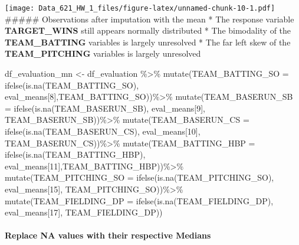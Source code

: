 \documentclass[
]{article}
\newenvironment{Shaded}{\begin{snugshade}}{\end{snugshade}}
\newcommand{\AttributeTok}[1]{\textcolor[rgb]{0.77,0.63,0.00}{#1}}
\newcommand{\DecValTok}[1]{\textcolor[rgb]{0.00,0.00,0.81}{#1}}
\newcommand{\FunctionTok}[1]{\textcolor[rgb]{0.00,0.00,0.00}{#1}}
\newcommand{\NormalTok}[1]{#1}
\newcommand{\OtherTok}[1]{\textcolor[rgb]{0.56,0.35,0.01}{#1}}
\newcommand{\SpecialCharTok}[1]{\textcolor[rgb]{0.00,0.00,0.00}{#1}}
\begin{document}
\texttt{[image: Data\_621\_HW\_1\_files/figure-latex/unnamed-chunk-10-1.pdf]}
\#\#\#\#\# Observations after imputation with the mean * The response
variable \textbf{TARGET\_WINS} still appears normally distributed * The
bimodality of the \textbf{TEAM\_BATTING} variables is largely unresolved
* The far left skew of the \textbf{TEAM\_PITCHING} variables is largely
unresolved

\begin{Shaded}
\begin{Highlighting}[]
\NormalTok{df\_evaluation\_mn }\OtherTok{\textless{}{-}}\NormalTok{ df\_evaluation }\SpecialCharTok{\%\textgreater{}\%}
  \FunctionTok{mutate}\NormalTok{(}\AttributeTok{TEAM\_BATTING\_SO =}
           \FunctionTok{ifelse}\NormalTok{(}\FunctionTok{is.na}\NormalTok{(TEAM\_BATTING\_SO),}
\NormalTok{                  eval\_means[}\DecValTok{8}\NormalTok{],TEAM\_BATTING\_SO))}\SpecialCharTok{\%\textgreater{}\%} 
  \FunctionTok{mutate}\NormalTok{(}\AttributeTok{TEAM\_BASERUN\_SB =} 
           \FunctionTok{ifelse}\NormalTok{(}\FunctionTok{is.na}\NormalTok{(TEAM\_BASERUN\_SB),}
\NormalTok{                  eval\_means[}\DecValTok{9}\NormalTok{], TEAM\_BASERUN\_SB))}\SpecialCharTok{\%\textgreater{}\%}
  \FunctionTok{mutate}\NormalTok{(}\AttributeTok{TEAM\_BASERUN\_CS =}
           \FunctionTok{ifelse}\NormalTok{(}\FunctionTok{is.na}\NormalTok{(TEAM\_BASERUN\_CS),}
\NormalTok{                  eval\_means[}\DecValTok{10}\NormalTok{], TEAM\_BASERUN\_CS))}\SpecialCharTok{\%\textgreater{}\%}
  \FunctionTok{mutate}\NormalTok{(}\AttributeTok{TEAM\_BATTING\_HBP =} 
           \FunctionTok{ifelse}\NormalTok{(}\FunctionTok{is.na}\NormalTok{(TEAM\_BATTING\_HBP),}
\NormalTok{                  eval\_means[}\DecValTok{11}\NormalTok{],TEAM\_BATTING\_HBP))}\SpecialCharTok{\%\textgreater{}\%}
  \FunctionTok{mutate}\NormalTok{(}\AttributeTok{TEAM\_PITCHING\_SO =}
           \FunctionTok{ifelse}\NormalTok{(}\FunctionTok{is.na}\NormalTok{(TEAM\_PITCHING\_SO),}
\NormalTok{                  eval\_means[}\DecValTok{15}\NormalTok{], TEAM\_PITCHING\_SO))}\SpecialCharTok{\%\textgreater{}\%}
  \FunctionTok{mutate}\NormalTok{(}\AttributeTok{TEAM\_FIELDING\_DP =}
           \FunctionTok{ifelse}\NormalTok{(}\FunctionTok{is.na}\NormalTok{(TEAM\_FIELDING\_DP),}
\NormalTok{                  eval\_means[}\DecValTok{17}\NormalTok{], TEAM\_FIELDING\_DP))}
\end{Highlighting}
\end{Shaded}

\hypertarget{replace-na-values-with-their-respective-medians}{%
\paragraph{\texorpdfstring{\textbf{Replace NA values with their
respective
Medians}}{Replace NA values with their respective Medians}}\label{replace-na-values-with-their-respective-medians}}
\end{document}
